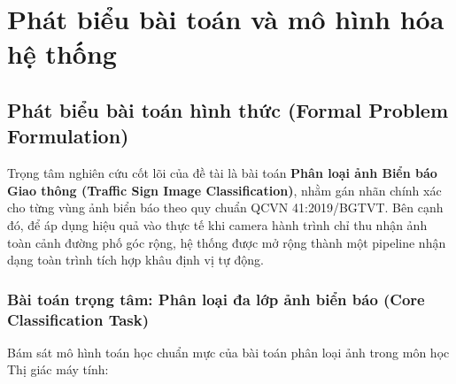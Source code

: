 \section{Phát biểu bài toán và mô hình hóa hệ thống}
\label{sec:phat_bieu_bai_toan}

\subsection{Phát biểu bài toán hình thức (Formal Problem Formulation)}
\label{subsec:phat_bieu_hinh_thuc}

Trọng tâm nghiên cứu cốt lõi của đề tài là bài toán \textbf{Phân loại ảnh Biển báo Giao thông (Traffic Sign Image Classification)}, nhằm gán nhãn chính xác cho từng vùng ảnh biển báo theo quy chuẩn QCVN 41:2019/BGTVT. Bên cạnh đó, để áp dụng hiệu quả vào thực tế khi camera hành trình chỉ thu nhận ảnh toàn cảnh đường phố góc rộng, hệ thống được mở rộng thành một pipeline nhận dạng toàn trình tích hợp khâu định vị tự động.

\subsubsection{Bài toán trọng tâm: Phân loại đa lớp ảnh biển báo (Core Classification Task)}
\label{subsubsec:core_classification_task}

Bám sát mô hình toán học chuẩn mực của bài toán phân loại ảnh trong môn học Thị giác máy tính:

